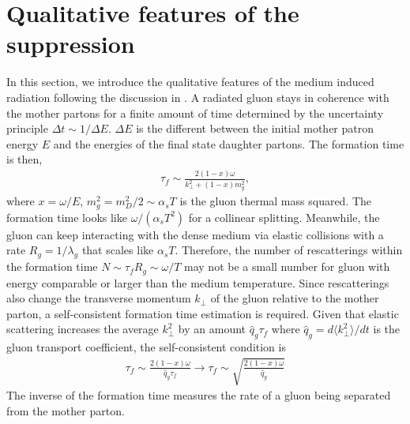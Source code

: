 \documentclass[aps, prc, reprint, amsmath, groupedaddress, nofootinbib]{revtex4-1}
\begin{document}
\section{Qualitative features of the suppression}\label{section:qual}
In this section, we introduce the qualitative features of the medium induced radiation following the discussion in \cite{Baier:1996kr}.
A radiated gluon stays in coherence with the mother partons for a finite amount of time determined by the uncertainty principle $\Delta t \sim 1/\Delta E$. 
$\Delta E$ is the different between the initial mother patron energy $E$ and the energies of the final state daughter partons.
The formation time is then,
\begin{eqnarray}\label{eq:tau_1}
\tau_f \sim \frac{2(1-x)\omega}{k_\perp^2+(1-x)m_g^2},
\end{eqnarray}
where $x = \omega/E$, $m_g^2=m_D^2/2 \sim \alpha_s T$ is the gluon thermal mass squared.
The formation time looks like $\omega/(\alpha_s T^2)$ for a collinear splitting.
Meanwhile, the gluon can keep interacting with the dense medium via elastic collisions with a rate $R_{g} = 1/\lambda_g$ that scales like $\alpha_s T$. 
Therefore, the number of rescatterings within the formation time $N \sim \tau_f R_g \sim \omega/T$ may not be a small number for gluon with energy comparable or larger than the medium temperature.
Since rescatterings also change the transverse momentum $k_\perp$ of the gluon relative to the mother parton, a self-consistent formation time estimation is required.
Given that elastic scattering increases the average $k_\perp^2$ by an amount $\hat{q}_g\tau_f$ where $\hat{q}_g = d\langle k_\perp^2\rangle/dt$ is the gluon transport coefficient, the self-consistent condition is
\begin{eqnarray}\label{eq:tau_n}
\tau_f \sim \frac{2(1-x)\omega}{\hat{q}_g\tau_f} \longrightarrow \tau_f \sim \sqrt{\frac{2(1-x)\omega}{\hat{q}_g}}
\end{eqnarray}
The inverse of the formation time measures the rate of a gluon being separated from the mother parton.
\end{document}
